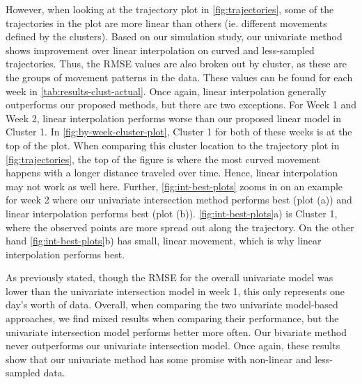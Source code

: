 \documentclass[12pt]{article}
\begin{document}
However, when looking at the trajectory plot in \cref{fig:trajectories},
some of the trajectories in the plot are more linear than others (ie.
different movements defined by the clusters). Based on our simulation
study, our univariate method shows improvement over linear interpolation
on curved and less-sampled trajectories. Thus, the RMSE values are also
broken out by cluster, as these are the groups of movement patterns in
the data. These values can be found for each week in
\cref{tab:results-clust-actual}. Once again, linear interpolation
generally outperforms our proposed methods, but there are two
exceptions. For Week 1 and Week 2, linear interpolation performs worse
than our proposed linear model in Cluster 1. In
\cref{fig:by-week-cluster-plot}, Cluster 1 for both of these weeks is at
the top of the plot. When comparing this cluster location to the
trajectory plot in \cref{fig:trajectories}, the top of the figure is
where the most curved movement happens with a longer distance traveled
over time. Hence, linear interpolation may not work as well here.
Further, \cref{fig:int-best-plots} zooms in on an example for week 2
where our univariate intersection method performs best (plot (a)) and
linear interpolation performs best (plot (b)).
\cref{fig:int-best-plots}a) is Cluster 1, where the observed points are
more spread out along the trajectory. On the other hand
\cref{fig:int-best-plots}b) has small, linear movement, which is why
linear interpolation performs best.

As previously stated, though the RMSE for the overall univariate model
was lower than the univariate intersection model in week 1, this only
represents one day's worth of data. Overall, when comparing the two
univariate model-based approaches, we find mixed results when comparing
their performance, but the univariate intersection model performs better
more often. Our bivariate method never outperforms our univariate
intersection model. Once again, these results show that our univariate
method has some promise with non-linear and less-sampled data.
\end{document}
